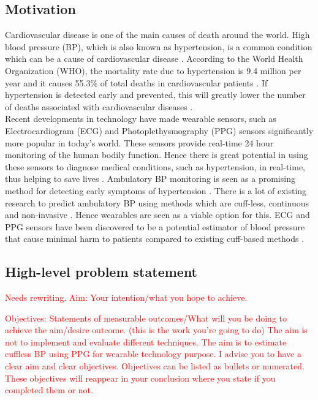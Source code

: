 \subsection{Motivation}
Cardiovascular disease is one of the main causes of death around the world. 
High blood pressure (BP), which is also known as hypertension, is a common 
condition which can be a cause of cardiovascular disease \cite{Sharma2017}. 
According to the World Health Organization (WHO), the mortality rate due 
to hypertension is 9.4 million per year and it causes 55.3\%  of  total  
deaths  in  cardiovascular patients \cite{Janjua2017}. If hypertension is 
detected early and prevented, this will greatly lower the number of deaths 
associated with cardiovascular 
diseases \cite{Janjua2017}. \\ \newline \noindent Recent developments in 
technology have made wearable sensors, such as Electrocardiogram (ECG) and 
Photoplethysmography (PPG) sensors significantly more popular in today's 
world. These sensors provide real-time 24 hour monitoring of the human 
bodily function. Hence there is great potential in using these sensors to 
diagnose medical conditions, such as hypertension, in real-time, thus 
helping to save lives \cite{Simjanoska20182}. Ambulatory BP monitoring 
is seen as a promising method for detecting early symptoms of 
hypertension \cite{Kario2021}. There is a lot of existing research to 
predict ambulatory BP using methods which are cuff-less, continuous 
and non-invasive \cite{Zaki2018}. Hence wearables are seen as a 
viable option for this. ECG and PPG sensors have been discovered 
to be a potential estimator of blood pressure that cause minimal 
harm to patients compared to existing cuff-based 
methods \cite{Malikeh2019} \cite{Bard2019}.

\subsection{High-level problem statement}
\textcolor{red}{Needs rewriting. Aim: Your intention/what you hope to achieve.}

\textcolor{red}{Objectives: Statements of measurable outcomes/What will you be doing to achieve the aim/desire outcome. (this is the work you're going to do)}
\textcolor{red}{The aim is not to implement and evaluate different techniques. The aim is to estimate cuffless BP using PPG for wearable technology purpose.}
\textcolor{red}{I advise you to have a clear aim and clear objectives. Objectives can be listed as bullets or numerated. These objectives will reappear in your conclusion where you state if you completed them or not.}

